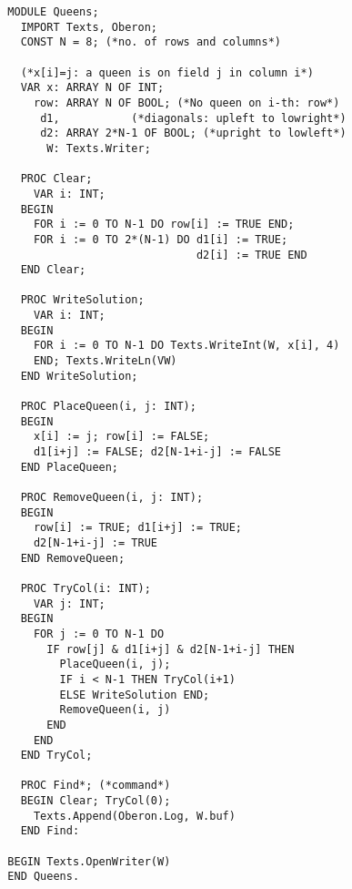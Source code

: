\begin{verbatim}
  MODULE Queens;
    IMPORT Texts, Oberon;
    CONST N = 8; (*no. of rows and columns*)

    (*x[i]=j: a queen is on field j in column i*)
    VAR x: ARRAY N OF INT;
      row: ARRAY N OF BOOL; (*No queen on i-th: row*)
       d1,           (*diagonals: upleft to lowright*)
       d2: ARRAY 2*N-1 OF BOOL; (*upright to lowleft*)
        W: Texts.Writer;
 
    PROC Clear;
      VAR i: INT;
    BEGIN
      FOR i := 0 TO N-1 DO row[i] := TRUE END;
      FOR i := 0 TO 2*(N-1) DO d1[i] := TRUE;
                               d2[i] := TRUE END
    END Clear;
 
    PROC WriteSolution;
      VAR i: INT;
    BEGIN
      FOR i := 0 TO N-1 DO Texts.WriteInt(W, x[i], 4)
      END; Texts.WriteLn(VW)
    END WriteSolution;
 
    PROC PlaceQueen(i, j: INT);
    BEGIN
      x[i] := j; row[i] := FALSE;
      d1[i+j] := FALSE; d2[N-1+i-j] := FALSE
    END PlaceQueen;
 
    PROC RemoveQueen(i, j: INT);
    BEGIN
      row[i] := TRUE; d1[i+j] := TRUE;
      d2[N-1+i-j] := TRUE
    END RemoveQueen;
 
    PROC TryCol(i: INT);
      VAR j: INT;
    BEGIN
      FOR j := 0 TO N-1 DO
        IF row[j] & d1[i+j] & d2[N-1+i-j] THEN
          PlaceQueen(i, j);
          IF i < N-1 THEN TryCol(i+1)
          ELSE WriteSolution END;
          RemoveQueen(i, j)
        END
      END
    END TryCol;
 
    PROC Find*; (*command*)
    BEGIN Clear; TryCol(0);
      Texts.Append(Oberon.Log, W.buf)
    END Find:
 
  BEGIN Texts.OpenWriter(W)
  END Queens.
\end{verbatim}
